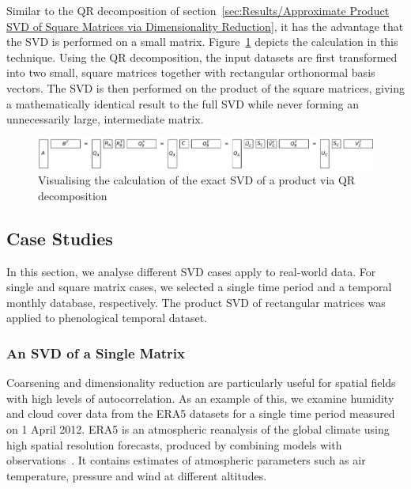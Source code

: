 \documentclass[ijgi,article,submit,moreauthors,pdftex,10pt,a4paper]{Definitions/mdpi}
\begin{document}
Similar to the QR decomposition of section~\ref{sec:Results/Approximate Product SVD of Square Matrices via Dimensionality Reduction}, it has the advantage that the SVD is performed on a small matrix. Figure~\ref{fig:qrProductSVD} depicts the calculation in this technique. Using the QR decomposition, the input datasets are first transformed into two small, square matrices together with rectangular orthonormal basis vectors. The SVD is then performed on the product of the square matrices, giving a mathematically identical result to the full SVD while never forming an unnecessarily large, intermediate matrix.

\begin{figure}[H]
\centering
\includegraphics[width=\textwidth]{Results/qrProductSVD.pdf}
\caption[Exact SVD via QR decomposition]{Visualising the calculation of the exact SVD of a product via QR decomposition}
\label{fig:qrProductSVD}
\end{figure}


\subsection{Case Studies}
In this section, we analyse different SVD cases apply to real-world data. For single and square matrix cases, we selected a single time period and a temporal monthly database, respectively. The product SVD of rectangular matrices was applied to phenological temporal dataset.

\subsubsection{An SVD of a Single Matrix}
\label{sec:Results/Case Study of an SVD of a Single Matrix} %

Coarsening and dimensionality reduction are particularly useful for spatial fields with high levels of autocorrelation. As an example of this, we examine humidity and cloud cover data from the ERA5 datasets for a single time period measured on 1 April 2012. ERA5 is an atmospheric reanalysis of the global climate using high spatial resolution forecasts, produced by combining models with observations~\cite{Dee2011}. It contains estimates of atmospheric parameters such as air temperature, pressure and wind at different altitudes.
\end{document}
